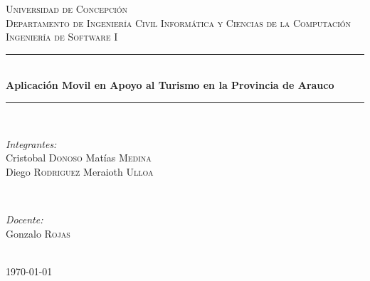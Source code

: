 \documentclass[12pt]{article}
\begin{document}
\begin{titlepage}

\newcommand{\HRule}{\rule{\linewidth}{0.5mm}} %

\center %
 

\textsc{\LARGE Universidad de Concepción}\\[1.5cm] %
\textsc{\Large Departamento de Ingeniería Civil Informática y Ciencias de la Computación}\\[0.5cm] %
\textsc{\large Ingeniería de Software I}\\[0.5cm] %


\HRule \\[0.4cm]
{ \huge \bfseries Aplicación Movil en Apoyo al Turismo en la Provincia de Arauco }\\[0.4cm] %
\HRule \\[1.5cm]
 

\begin{minipage}{0.4\textwidth}
\begin{flushleft} \large
\emph{Integrantes:}\\
Cristobal \textsc{Donoso}
Matías \textsc{Medina}\\
Diego \textsc{Rodriguez}
Meraioth \textsc{Ulloa}
\end{flushleft}
\end{minipage}
~
\begin{minipage}{0.4\textwidth}
\begin{flushright} \large
\emph{Docente:} \\
Gonzalo \textsc{Rojas} %
\end{flushright}
\end{minipage}\\[4cm]

{\large \today}\\[3cm] %
\vfill %
\end{titlepage}
\tableofcontents
\newpage
\end{document}
